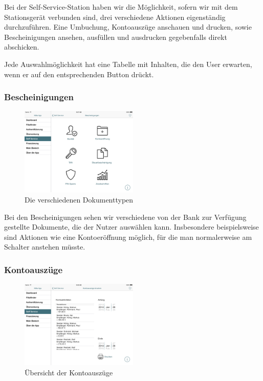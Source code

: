 \noindent	Bei der Self-Service-Station haben wir die Möglichkeit, sofern wir mit dem Stationsgerät verbunden sind, drei verschiedene Aktionen eigenständig durchzuführen. Eine Umbuchung, Kontoauszüge anschauen und drucken, sowie Bescheinigungen ansehen, ausfüllen und ausdrucken gegebenfalls direkt abschicken.

	Jede Auswahlmöglichkeit hat eine Tabelle mit Inhalten, die den User erwarten, wenn er auf den entsprechenden Button drückt.

\subsubsection{Bescheinigungen}
\begin{figure}[h]
	\centering
  \includegraphics[width=0.5\textwidth]{Pictures/Bescheinigungen}
	\caption{Die verschiedenen Dokumenttypen}
	\label{fig6}
\end{figure}

	Bei den Bescheinigungen sehen wir verschiedene von der Bank zur Verfügung gestellte Dokumente, die der Nutzer auswählen kann. Insbesondere beispielsweise sind Aktionen wie eine Kontoeröffnung möglich, für die man normalerweise am Schalter anstehen müsste.

\subsubsection{Kontoauszüge}
\begin{figure}[h]
	\centering
  \includegraphics[width=0.5\textwidth]{Pictures/kontoauszuege}
	\caption{Übersicht der Kontoauszüge}
	\label{fig7}
\end{figure}

